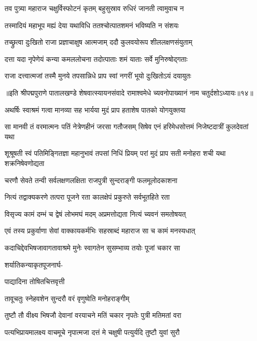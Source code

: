 \twolineshloka
{तव पुत्र्या महाराज चक्षुर्विस्फोटनं कृतम्}
{बहुसुस्राव रुधिरं जानती त्वामुवाच न}%

\twolineshloka
{तस्मादियं महाभूप मह्यं देया यथाविधि}
{ततश्चोत्पातशमनं भविष्यति न संशयः}%

\twolineshloka
{तच्छ्रुत्वा दुःखितो राजा प्रज्ञाचाक्षुष आत्मजाम्}
{ददौ कुलवयोरूप शीललक्षणसंयुताम्}%

\twolineshloka
{दत्ता यदा नृपेणेयं कन्या कमललोचना}
{तदोत्पाताः शमं याताः सर्वे मुनिरुषोद्गताः}%

\twolineshloka
{राजा दत्त्वात्मजां तस्मै मुनये तपसान्निधे}
{प्राप स्वां नगरीं भूयो दुःखितोऽयं दयायुतः}%

{॥इति श्रीपद्मपुराणे पातालखण्डे शेषवात्स्यायनसंवादे रामाश्वमेधे च्यवनोपाख्यानं नाम चतुर्दशोऽध्यायः॥१४॥}



\twolineshloka
{अथर्षिः स्वाश्रमं गत्वा मानव्या सह भार्यया}
{मुदं प्राप हताशेष पातको योगयुक्तया}%

\fourlineindentedshloka
{सा मानवी तं वरमात्मनः पतिं}
{नेत्रेणहीनं जरसा गतौजसम्}
{सिषेव एनं हरिमेधसोत्तमं}
{निजेष्टदात्रीं कुलदेवतां यथा}%

\fourlineindentedshloka
{शूश्रूषती स्वं पतिमिङ्गितज्ञा}
{महानुभावं तपसां निधिं प्रियम्}
{परां मुदं प्राप सती मनोहरा}
{शची यथा शक्रनिषेवणोद्यता}%

\twolineshloka
{चरणौ सेवते तन्वी सर्वलक्षणलक्षिता}
{राजपुत्री सुन्दराङ्गी फलमूलोदकाशना}%

\twolineshloka
{नित्यं तद्वाक्यकरणे तत्परा पूजने रता}
{कालक्षेपं प्रकुरुते सर्वभूतहिते रता}%

\twolineshloka
{विसृज्य कामं दम्भं च द्वेषं लोभमघं मदम्}
{अप्रमत्तोद्यता नित्यं च्यवनं समतोषयत्}%

\twolineshloka
{एवं तस्य प्रकुर्वाणा सेवां वाक्कायकर्मभिः}
{सहस्राब्दं महाराज सा च कामं मनस्यधात्}%

\twolineshloka
{कदाचिद्देवभिषजावागतावाश्रमे मुनेः}
{स्वागतेन सुसम्भाव्य तयोः पूजां चकार सा}%

शर्यातिकन्याकृतपूजनार्घ-

पाद्यादिना तोषितचित्तवृत्ती

\twolineshloka
{तावूचतुः स्नेहवशेन सुन्दरौ}
{वरं वृणुष्वेति मनोहराङ्गीम्}%

\twolineshloka
{तुष्टौ तौ वीक्ष्य भिषजौ देवानां वरयाचने}
{मतिं चकार नृपतेः पुत्री मतिमतां वरा}%

\twolineshloka
{पत्यभिप्रायमालक्ष्य वाचमूचे नृपात्मजा}
{दत्तं मे चक्षुषी पत्युर्यदि तुष्टौ युवां सुरौ}%

